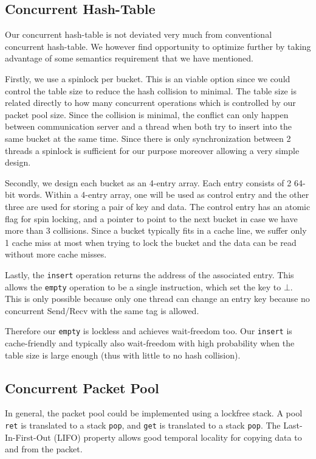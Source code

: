 \documentclass[11pt]{article}
\begin{document}
\subsection{Concurrent Hash-Table}
Our concurrent hash-table is not deviated very much from conventional
concurrent hash-table. We however find opportunity to optimize further by taking 
advantage of some semantics requirement that we have mentioned.

Firstly, we use a spinlock per bucket. This is an viable option since we could
control the table size to reduce the hash collision to minimal. The table size is
related directly to how many concurrent operations which is controlled by 
our packet pool size. Since the collision is minimal, the conflict can only happen
between communication server and a thread when both try to insert into the same
bucket at the same time. Since there is only synchronization between 2 threads
a spinlock is sufficient for our purpose moreover allowing a very simple design.

Secondly, we design each bucket as an 4-entry array. Each entry consists of 2
64-bit words. Within a 4-entry array, one will be used as control entry and the
other three are used for storing a pair of key and data. The control entry has
an atomic flag for spin locking, and a pointer to point to the next bucket in
case we have more than 3 collisions. Since a bucket typically fits in a cache
line, we suffer only 1 cache miss at most when trying to lock the bucket and
the data can be read without more cache misses.

Lastly, the \texttt{insert} operation returns the address of the associated
entry. This allows the \texttt{empty} operation to be a single instruction,
which set the key to $\bot$. This is only possible because only one thread can
change an entry key because no concurrent Send/Recv with the same tag is allowed.

Therefore our \texttt{empty} is lockless and achieves wait-freedom too. Our
\texttt{insert} is cache-friendly and typically also wait-freedom with high probability 
when the table size is large enough (thus with little to no hash collision).

\subsection{Concurrent Packet Pool}
In general, the packet pool could be implemented using a lockfree stack. A pool
\texttt{ret} is translated to a stack \texttt{pop}, and \texttt{get} is
translated to a stack \texttt{pop}.  The Last-In-First-Out (LIFO) property
allows good temporal locality for copying data to and from the packet.
\end{document}
